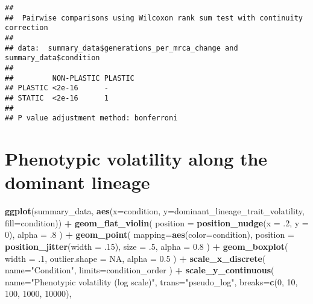 \documentclass[]{book}
\newenvironment{Shaded}{\begin{snugshade}}{\end{snugshade}}
\newcommand{\DataTypeTok}[1]{\textcolor[rgb]{0.13,0.29,0.53}{#1}}
\newcommand{\DecValTok}[1]{\textcolor[rgb]{0.00,0.00,0.81}{#1}}
\newcommand{\FloatTok}[1]{\textcolor[rgb]{0.00,0.00,0.81}{#1}}
\newcommand{\KeywordTok}[1]{\textcolor[rgb]{0.13,0.29,0.53}{\textbf{#1}}}
\newcommand{\NormalTok}[1]{#1}
\newcommand{\OperatorTok}[1]{\textcolor[rgb]{0.81,0.36,0.00}{\textbf{#1}}}
\newcommand{\OtherTok}[1]{\textcolor[rgb]{0.56,0.35,0.01}{#1}}
\newcommand{\StringTok}[1]{\textcolor[rgb]{0.31,0.60,0.02}{#1}}
\begin{document}
\begin{verbatim}
## 
##  Pairwise comparisons using Wilcoxon rank sum test with continuity correction 
## 
## data:  summary_data$generations_per_mrca_change and summary_data$condition 
## 
##         NON-PLASTIC PLASTIC
## PLASTIC <2e-16      -      
## STATIC  <2e-16      1      
## 
## P value adjustment method: bonferroni
\end{verbatim}

\hypertarget{phenotypic-volatility-along-the-dominant-lineage-1}{%
\section{Phenotypic volatility along the dominant lineage}\label{phenotypic-volatility-along-the-dominant-lineage-1}}

\begin{Shaded}
\begin{Highlighting}[]
\KeywordTok{ggplot}\NormalTok{(summary_data, }\KeywordTok{aes}\NormalTok{(}\DataTypeTok{x=}\NormalTok{condition, }\DataTypeTok{y=}\NormalTok{dominant_lineage_trait_volatility, }\DataTypeTok{fill=}\NormalTok{condition)) }\OperatorTok{+}
\StringTok{  }\KeywordTok{geom_flat_violin}\NormalTok{(}
    \DataTypeTok{position =} \KeywordTok{position_nudge}\NormalTok{(}\DataTypeTok{x =} \FloatTok{.2}\NormalTok{, }\DataTypeTok{y =} \DecValTok{0}\NormalTok{),}
    \DataTypeTok{alpha =} \FloatTok{.8}
\NormalTok{  ) }\OperatorTok{+}
\StringTok{  }\KeywordTok{geom_point}\NormalTok{(}
    \DataTypeTok{mapping=}\KeywordTok{aes}\NormalTok{(}\DataTypeTok{color=}\NormalTok{condition),}
    \DataTypeTok{position =} \KeywordTok{position_jitter}\NormalTok{(}\DataTypeTok{width =} \FloatTok{.15}\NormalTok{),}
    \DataTypeTok{size =} \FloatTok{.5}\NormalTok{,}
    \DataTypeTok{alpha =} \FloatTok{0.8}
\NormalTok{  ) }\OperatorTok{+}
\StringTok{  }\KeywordTok{geom_boxplot}\NormalTok{(}
    \DataTypeTok{width =} \FloatTok{.1}\NormalTok{,}
    \DataTypeTok{outlier.shape =} \OtherTok{NA}\NormalTok{,}
    \DataTypeTok{alpha =} \FloatTok{0.5}
\NormalTok{  ) }\OperatorTok{+}
\StringTok{  }\KeywordTok{scale_x_discrete}\NormalTok{(}
    \DataTypeTok{name=}\StringTok{"Condition"}\NormalTok{,}
    \DataTypeTok{limits=}\NormalTok{condition_order}
\NormalTok{  ) }\OperatorTok{+}
\StringTok{  }\KeywordTok{scale_y_continuous}\NormalTok{(}
    \DataTypeTok{name=}\StringTok{"Phenotypic volatility (log scale)"}\NormalTok{,}
    \DataTypeTok{trans=}\StringTok{"pseudo_log"}\NormalTok{,}
    \DataTypeTok{breaks=}\KeywordTok{c}\NormalTok{(}\DecValTok{0}\NormalTok{, }\DecValTok{10}\NormalTok{, }\DecValTok{100}\NormalTok{, }\DecValTok{1000}\NormalTok{, }\DecValTok{10000}\NormalTok{),}

\end{Highlighting}
\end{Shaded}
\end{document}

